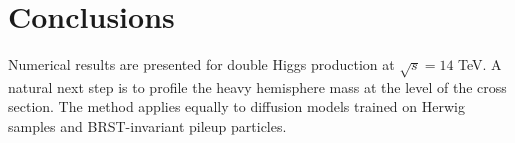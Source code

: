 \section{Conclusions}\label{sec:conclusions}

Numerical results are presented for double Higgs production at $\sqrt{s}
= 14$ TeV. A natural next step is to profile the heavy hemisphere mass
at the level of the cross section. The method applies equally to
diffusion models trained on Herwig samples and BRST-invariant pileup
particles.

